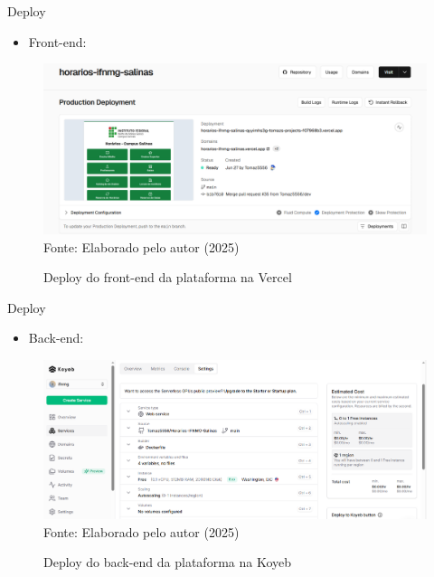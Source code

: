 \begin{frame}{Deploy}
    \begin{itemize}
        \item Front-end:
    \end{itemize}
    \begin{figure}
        \centering
        \vspace{-0.3cm}
        \caption{Deploy do front-end da plataforma na Vercel}
        \vspace{-0.2cm}
        \includegraphics[width=1\textwidth]{figuras/deploy-1.png}
        \\ %
        \footnotesize Fonte: Elaborado pelo autor (2025)
    \end{figure}
\end{frame}

\begin{frame}{Deploy}
    \begin{itemize}
        \item Back-end:
    \end{itemize}
    \begin{figure}
        \centering
        \vspace{-0.3cm}
        \caption{Deploy do back-end da plataforma na Koyeb}
        \vspace{-0.2cm}
        \includegraphics[width=1\textwidth]{figuras/deploy-2.png}
        \\ %
        \footnotesize Fonte: Elaborado pelo autor (2025)
    \end{figure}
\end{frame}

